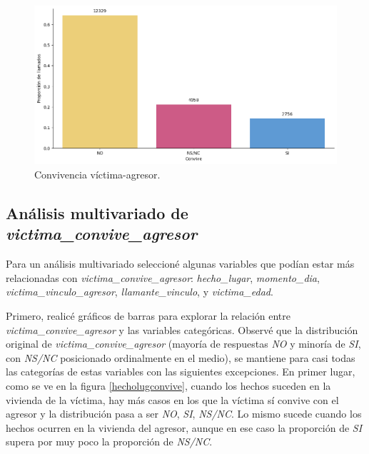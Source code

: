 \documentclass[10 pt]{article}
\begin{document}
\begin{figure}[H]
    \begin{center}
    \includegraphics[scale=.5]{images/latex_convive.png}
    \caption{Convivencia víctima-agresor.}
    \label{convivencia}
    \end{center}
    \end{figure}


\subsection*{Análisis multivariado de \textit{victima\_convive\_agresor}}\label{faltantes}



Para un análisis multivariado seleccioné algunas variables que podían estar más relacionadas con \textit{victima\_convive\_agresor}: \textit{hecho\_lugar}, \textit{momento\_dia}, \textit{victima\_vinculo\_agresor}, \textit{llamante\_vinculo}, y \textit{victima\_edad}. 

Primero, realicé gráficos de barras para explorar la relación entre \textit{victima\_convive\_agresor} y las variables categóricas.
Observé que la distribución original de \textit{victima\_convive\_agresor} (mayoría de respuestas \textit{NO} y minoría de \textit{SI}, con \textit{NS/NC} posicionado ordinalmente en el medio), se mantiene para casi todas las categorías de estas variables con las siguientes excepciones. En primer lugar, como se ve en la figura \ref{hecholugconvive}, cuando los hechos suceden en la vivienda de la víctima, hay más casos en los que la víctima sí convive con el agresor y la distribución pasa a ser \textit{NO}, \textit{SI}, \textit{NS/NC}. Lo mismo sucede cuando los hechos ocurren en la vivienda del agresor, aunque en ese caso la proporción de \textit{SI} supera por muy poco la proporción de \textit{NS/NC}. 
\end{document}
